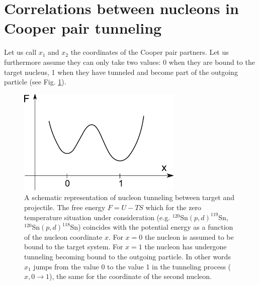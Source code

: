\section[Correlations in Cooper pair tunneling]{Correlations between nucleons in Cooper pair tunneling}\label{C3S3}
Let us call $x_1$ and $x_2$ the coordinates of the Cooper pair partners. Let us furthermore assume they can only take two values: 0 when they are bound to the target nucleus, 1 when they have tunneled and become part of the outgoing particle (see Fig. \ref{fig3.3.1}).
\begin{figure}
\centerline{\includegraphics*[width=0.7\textwidth,angle=0]{nutshell/figs/fig3_3_1.pdf}}
\caption{A schematic representation of nucleon tunneling between target and projectile. The free energy $F=U-TS$ which for the zero temperature situation under consideration (e.g. $^{120}$Sn$(p,d)^{119}$Sn, $^{120}$Sn$(p,d)^{118}$Sn) coincides with the potential energy as a function of the nucleon coordinate $x$. For $x=0$ the nucleon is assumed to be bound to the target system. For $x=1$ the nucleon has undergone tunneling becoming bound to the outgoing particle. In other words $x_1$ jumps from the value 0 to the value 1 in the tunneling process ($x, 0\rightarrow 1$), the same for the coordinate of the second nucleon.}\label{fig3.3.1}
\end{figure}

